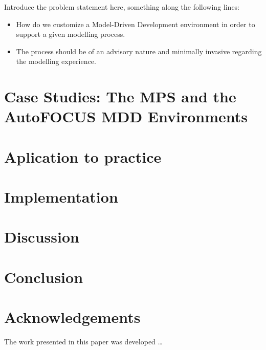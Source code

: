 

Introduce the problem statement here, something along the following
lines: 

\begin{itemize}
  \item How do we customize a Model-Driven Development environment in order to
  support a given modelling process.
  \item The process should be of an advisory nature and minimally invasive
  regarding the modelling experience.
\end{itemize} 

 

\section{Case Studies: The MPS and the AutoFOCUS MDD Environments}


\section{Aplication to practice}
 

\section{Implementation}


\section{Discussion}

\section{Conclusion} 

\section*{Acknowledgements}
The work presented in this paper was developed \ldots






